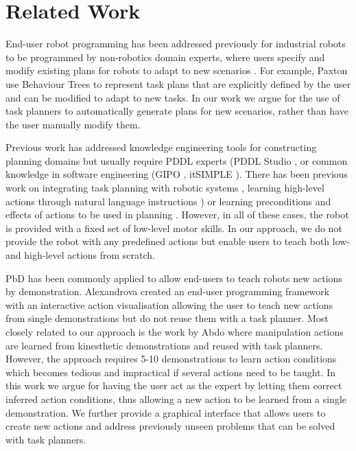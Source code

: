 \section{Related Work} \label{sec:relatedwork}
End-user robot programming has been addressed previously for industrial robots to be programmed by non-robotics domain experts, where users specify and modify existing plans for robots to adapt to new scenarios \cite{paxton2017costar,perzylo2016intuitive,stenmark2017simplified}.
For example, Paxton \etal \cite{paxton2017costar} use Behaviour Trees to represent task plans that are explicitly defined by the user and can be modified to adapt to new tasks.
In our work we argue for the use of task planners to automatically generate plans for new scenarios, rather than have the user manually modify them.

Previous work has addressed knowledge engineering tools for constructing planning domains but usually require PDDL experts (PDDL Studio \cite{plch2012inspect}, or common knowledge in software engineering (GIPO \cite{simpson2007planning}, itSIMPLE \cite{vaquero2013itsimple}).
There has been previous work on integrating task planning with robotic systems \cite{cashmore2015rosplan,kuhner2018closed}, learning high-level actions through natural language instructions \cite{she2014teaching}) or learning preconditions and effects of actions to be used in planning \cite{jetchev2013learning,konidaris2018fromSkills,ugur2015bottom}.
However, in all of these cases, the robot is provided with a fixed set of low-level motor skills.
In our approach, we do not provide the robot with any predefined actions but enable users to teach both low- and high-level actions from scratch.

PbD has been commonly applied to allow end-users to teach robots new actions by demonstration.
Alexandrova \etal \cite{alexandrova2014robot} created an end-user programming framework with an interactive action visualisation allowing the user to teach new actions from single demonstrations but do not reuse them with a task planner.
Most closely related to our approach is the work by Abdo \etal \cite{abdo2013learning} where manipulation actions are learned from kinesthetic demonstrations and reused with task planners.
However, the approach requires 5-10 demonstrations to learn action conditions which becomes tedious and impractical if several actions need to be taught.
In this work we argue for having the user act as the expert by letting them correct inferred action conditions, thus allowing a new action to be learned from a single demonstration.
We further provide a graphical interface that allows users to create new actions and address previously unseen problems that can be solved with task planners.


